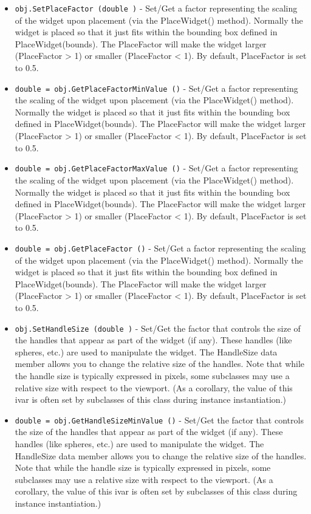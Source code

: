 \begin{itemize}
\item  \verb|obj.SetPlaceFactor (double )| -  Set/Get a factor representing the scaling of the widget upon placement
 (via the PlaceWidget() method). Normally the widget is placed so that
 it just fits within the bounding box defined in PlaceWidget(bounds).
 The PlaceFactor will make the widget larger (PlaceFactor > 1) or smaller
 (PlaceFactor < 1). By default, PlaceFactor is set to 0.5.

\item  \verb|double = obj.GetPlaceFactorMinValue ()| -  Set/Get a factor representing the scaling of the widget upon placement
 (via the PlaceWidget() method). Normally the widget is placed so that
 it just fits within the bounding box defined in PlaceWidget(bounds).
 The PlaceFactor will make the widget larger (PlaceFactor > 1) or smaller
 (PlaceFactor < 1). By default, PlaceFactor is set to 0.5.

\item  \verb|double = obj.GetPlaceFactorMaxValue ()| -  Set/Get a factor representing the scaling of the widget upon placement
 (via the PlaceWidget() method). Normally the widget is placed so that
 it just fits within the bounding box defined in PlaceWidget(bounds).
 The PlaceFactor will make the widget larger (PlaceFactor > 1) or smaller
 (PlaceFactor < 1). By default, PlaceFactor is set to 0.5.

\item  \verb|double = obj.GetPlaceFactor ()| -  Set/Get a factor representing the scaling of the widget upon placement
 (via the PlaceWidget() method). Normally the widget is placed so that
 it just fits within the bounding box defined in PlaceWidget(bounds).
 The PlaceFactor will make the widget larger (PlaceFactor > 1) or smaller
 (PlaceFactor < 1). By default, PlaceFactor is set to 0.5.

\item  \verb|obj.SetHandleSize (double )| -  Set/Get the factor that controls the size of the handles that appear as
 part of the widget (if any). These handles (like spheres, etc.)  are
 used to manipulate the widget. The HandleSize data member allows you
 to change the relative size of the handles. Note that while the handle
 size is typically expressed in pixels, some subclasses may use a relative size
 with respect to the viewport. (As a corollary, the value of this ivar is often
 set by subclasses of this class during instance instantiation.)

\item  \verb|double = obj.GetHandleSizeMinValue ()| -  Set/Get the factor that controls the size of the handles that appear as
 part of the widget (if any). These handles (like spheres, etc.)  are
 used to manipulate the widget. The HandleSize data member allows you
 to change the relative size of the handles. Note that while the handle
 size is typically expressed in pixels, some subclasses may use a relative size
 with respect to the viewport. (As a corollary, the value of this ivar is often
 set by subclasses of this class during instance instantiation.)


\end{itemize}
